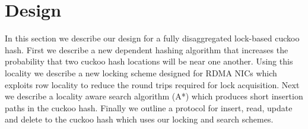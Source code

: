 \section{Design}

In this section we describe our design for a fully
disaggregated lock-based cuckoo hash. First we describe a
new dependent hashing algorithm that increases the
probability that two cuckoo hash locations will be near one
another. Using this locality we describe a new locking
scheme designed for RDMA NICs which exploits row locality to
reduce the round trips required for lock acquisition. Next
we describe a locality aware search algorithm (A*) which
produces short insertion paths in the cuckoo hash. Finally
we outline a protocol for insert, read, update and delete to
the cuckoo hash which uses our locking and search schemes.

\label{sec:design}

